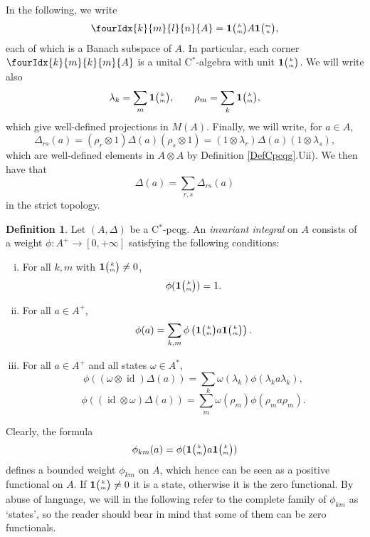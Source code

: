 \documentclass[11pt]{article}
\DeclareMathOperator{\id}{id}
\newcommand{\C}{\mathbb{C}}
\newcommand{\Grt}[3]{#1{\tiny {\begin{pmatrix} #2\\#3\end{pmatrix}}}}
\newcommand{\UnitC}[2]{\Grt{\mathbf{1}}{#1}{#2}}
\newcommand{\Gr}[5]{\fourIdx{#2}{#4}{#3}{#5}{#1}}%
\theoremstyle{definition}
\newtheorem{Def}[Theorem]{Definition}
\numberwithin{equation}{section}
\begin{document}
In the following, we write \[\Gr{A}{k}{l}{m}{n} = \UnitC{k}{m}A\UnitC{m}{n},\] each of which is a Banach subspace of $A$. In particular, each corner $\Gr{A}{k}{k}{m}{m}$ is a unital C$^*$-algebra with unit $\UnitC{k}{m}$. We will write also \[\lambda_k = \sum_{m}\UnitC{k}{m},\qquad \rho_m = \sum_{k}\UnitC{k}{m},\] which give well-defined projections in $M(A)$. Finally, we will write, for $a\in A$, \[\Delta_{rs}(a) = (\rho_r\otimes 1)\Delta(a)(\rho_s\otimes 1) = (1\otimes \lambda_r)\Delta(a)(1\otimes \lambda_s),\] which are well-defined elements in $A\otimes A$ by Definition \ref{DefCpcqg}.Uii). We then have that  \[\Delta(a) = \sum_{r,s} \Delta_{rs}(a)\] in the strict topology. 

\begin{Def} Let $(A,\Delta)$ be a C$^*$-pcqg. An \emph{invariant integral} on $A$ consists of a weight $\phi: A^+ \rightarrow [0,+\infty]$ satisfying the following conditions:
\begin{enumerate}[i)]
\item For all $k,m$ with $\UnitC{k}{m}\neq 0$, \[\phi(\UnitC{k}{m}) = 1.\]
\item For all $a\in A^+$, \[\phi(a) = \sum_{k,m} \phi\left(\UnitC{k}{m}a\UnitC{k}{m}\right).\]
\item For all $a\in A^+$ and all states $\omega\in A^*$, \begin{equation}\label{EqInvL} \phi((\omega \otimes \id)\Delta(a)) = \sum_{k} \omega(\lambda_k)\phi(\lambda_ka\lambda_k),\end{equation} \begin{equation}\label{EqInvR} \phi((\id\otimes \omega)\Delta(a)) = \sum_{m}\omega(\rho_m)\phi(\rho_ma\rho_m).\end{equation}
\end{enumerate} 
\end{Def}





Clearly, the formula \[\phi_{km}(a) = \phi(\UnitC{k}{m}a\UnitC{k}{m})\] defines a bounded weight $\phi_{km}$ on $A$, which hence can be seen as a positive functional on $A$. If $\UnitC{k}{m}\neq 0$ it is a state, otherwise it is the zero functional. By abuse of language, we will in the following refer to the complete family of $\phi_{km}$ as `states', so the reader should bear in mind that some of them can be zero functionals.
\end{document}
